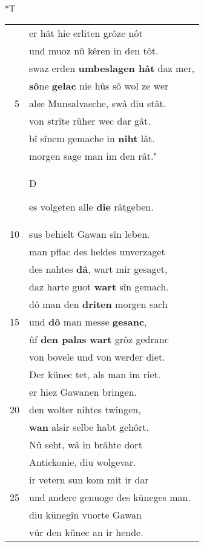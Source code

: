 \documentclass[8pt,a4paper,notitlepage]{article}
\begin{document}
\begin{table}[ht]
\begin{minipage}[t]{0.5\linewidth}
\end{minipage}
\hspace{0.5cm}
\begin{minipage}[t]{0.5\linewidth}
\small
\begin{center}*T
\end{center}
\begin{tabular}{rl}
 & er hât hie erliten grôze nôt\\ 
 & und muoz nû kêren in den tôt.\\ 
 & swaz erden \textbf{umbeslagen hât} daz mer,\\ 
 & \textbf{sô}ne \textbf{gelac} nie hûs sô wol ze wer\\ 
5 & alse Munsalvasche, swâ diu stât.\\ 
 & von strîte rûher wec dar gât.\\ 
 & bî sînem gemache in \textbf{niht} lât.\\ 
 & morgen sage man im den rât."\\ 
 & \begin{large}D\end{large}es volgeten alle \textbf{die} râtgeben.\\ 
10 & sus behielt Gawan sîn leben.\\ 
 & man pflac des heldes unverzaget\\ 
 & des nahtes \textbf{dâ}, wart mir gesaget,\\ 
 & daz harte guot \textbf{wart} sîn gemach.\\ 
 & dô man den \textbf{driten} morgen sach\\ 
15 & und \textbf{dô} man messe \textbf{gesanc},\\ 
 & ûf \textbf{den palas} \textbf{wart} grôz gedranc\\ 
 & von bovele und von werder diet.\\ 
 & Der künec tet, als man im riet.\\ 
 & er hiez Gawanen bringen.\\ 
20 & den wolter nihtes twingen,\\ 
 & \textbf{wan} alsir selbe habt gehôrt.\\ 
 & Nû seht, wâ in brâhte dort\\ 
 & Antickonie, diu wolgevar.\\ 
 & ir vetern sun kom mit ir dar\\ 
25 & und andere genuoge des küneges man.\\ 
 & diu künegîn vuorte Gawan\\ 
 & vür den künec an ir hende.\\ 

\end{tabular}
\end{minipage}
\end{table}
\end{document}
